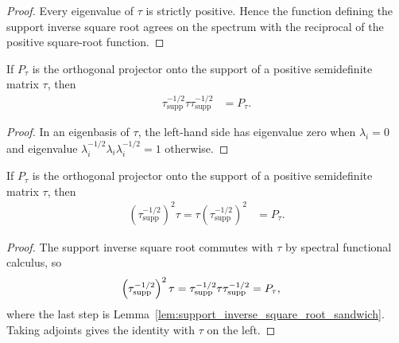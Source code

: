 \begin{proof}\leanok
    Every eigenvalue of $\tau$ is strictly positive. Hence the function
    defining the support inverse square root agrees on the spectrum with the
    reciprocal of the positive square-root function.
\end{proof}

\begin{lemma}
    \label{lem:support_inverse_square_root_sandwich}
    \leanok
    If $P_\tau$ is the orthogonal projector onto the support of a positive
    semidefinite matrix $\tau$, then
    \begin{align}
        \tau^{-1/2}_{\mathrm{supp}} \tau
        \tau^{-1/2}_{\mathrm{supp}}
        &=P_\tau.
        \label{eq:entropy_support_sandwich}
    \end{align}
\end{lemma}

\begin{proof}\leanok
    In an eigenbasis of $\tau$, the left-hand side has eigenvalue zero when
    $\lambda_i=0$ and eigenvalue
    $\lambda_i^{-1/2}\lambda_i\lambda_i^{-1/2}=1$ otherwise.
\end{proof}

\begin{lemma}
    \label{lem:support_inverse_square_root_generalized_inverse}
    \leanok
    If $P_\tau$ is the orthogonal projector onto the support of a positive
    semidefinite matrix $\tau$, then
    \begin{align}
        \left(\tau^{-1/2}_{\mathrm{supp}}\right)^2\tau
        =\tau\left(\tau^{-1/2}_{\mathrm{supp}}\right)^2
        &=P_\tau.
        \label{eq:entropy_support_generalized_inv}
    \end{align}
\end{lemma}

\begin{proof}\leanok
    The support inverse square root commutes with $\tau$ by spectral functional
    calculus, so
    \begin{align}
        \left(\tau^{-1/2}_{\mathrm{supp}}\right)^2\tau
        &=\tau^{-1/2}_{\mathrm{supp}} \tau
          \tau^{-1/2}_{\mathrm{supp}}
          =P_\tau,
        \notag
    \end{align}
    where the last step is
    Lemma~\ref{lem:support_inverse_square_root_sandwich}. Taking adjoints gives
    the identity with $\tau$ on the left.
\end{proof}

